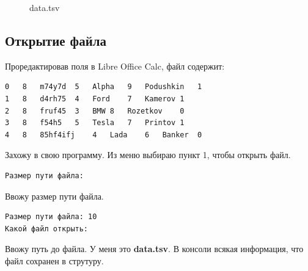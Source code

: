 \begin{figure}[h]
    \caption{data.tsv}
    \label{fig:data-tsv-on-github}
\end{figure}

\subsection{Открытие файла}

Проредактировав поля в Libre Office Calc, файл содержит:

\begin{tcolorbox}
\begin{verbatim}
0	8	m74y7d	5	Alpha	9	Podushkin	1
1	8	d4rh75	4	Ford	7	Kamerov	1
2	8	fruf45	3	BMW	8	Rozetkov	0
3	8	f54h5	5	Tesla	7	Printov	1
4	8	85hf4ifj	4	Lada	6	Banker	0
\end{verbatim}
\end{tcolorbox}

Захожу в свою программу. Из меню выбираю пункт 1, чтобы открыть файл.

\begin{tcolorbox}
\begin{verbatim}
Размер пути файла: 
\end{verbatim}
\end{tcolorbox}

Ввожу размер пути файла.

\begin{tcolorbox}
\begin{verbatim}
Размер пути файла: 10
Какой файл открыть:     
\end{verbatim}
\end{tcolorbox}

Ввожу путь до файла. У меня это \textbf{data.tsv}. В консоли всякая информация, что файл сохранен в струтуру.

